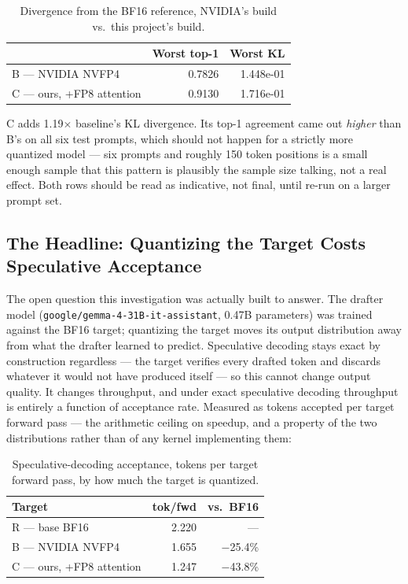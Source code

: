 \documentclass[11pt]{article}
\begin{document}
\begin{table}[h]
\centering
\small
\begin{tabular}{lrr}
\toprule
 & Worst top-1 & Worst KL \\
\midrule
B --- NVIDIA NVFP4 & 0.7826 & 1.448e-01 \\
C --- ours, +FP8 attention & 0.9130 & 1.716e-01 \\
\bottomrule
\end{tabular}
\caption{Divergence from the BF16 reference, NVIDIA's build vs.\ this project's build.}
\end{table}

C adds 1.19$\times$ baseline's KL divergence. Its top-1 agreement came out
\emph{higher} than B's on all six test prompts, which should not happen for a strictly
more quantized model --- six prompts and roughly 150 token positions is a small enough
sample that this pattern is plausibly the sample size talking, not a real effect. Both
rows should be read as indicative, not final, until re-run on a larger prompt set.

\subsection{The Headline: Quantizing the Target Costs Speculative Acceptance}
\label{sec:gemma-headline}

The open question this investigation was actually built to answer. The drafter model
(\texttt{google/gemma-4-31B-it-assistant}, 0.47B parameters) was trained against the
BF16 target; quantizing the target moves its output distribution away from what the
drafter learned to predict. Speculative decoding stays exact by construction regardless
--- the target verifies every drafted token and discards whatever it would not have
produced itself --- so this cannot change output quality. It changes throughput, and
under exact speculative decoding throughput is entirely a function of acceptance rate.
Measured as tokens accepted per target forward pass --- the arithmetic ceiling on
speedup, and a property of the two distributions rather than of any kernel implementing
them:

\begin{table}[h]
\centering
\small
\begin{tabular}{lrr}
\toprule
Target & tok/fwd & vs.\ BF16 \\
\midrule
R --- base BF16 & 2.220 & --- \\
B --- NVIDIA NVFP4 & 1.655 & $-$25.4\% \\
C --- ours, +FP8 attention & 1.247 & $-$43.8\% \\
\bottomrule
\end{tabular}
\caption{Speculative-decoding acceptance, tokens per target forward pass, by how much
the target is quantized.}
\end{table}
\end{document}
